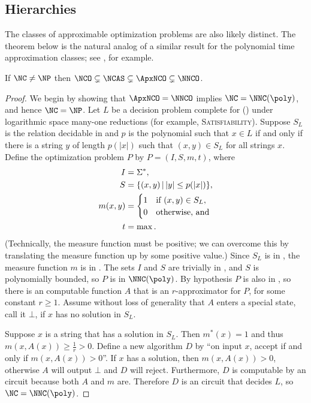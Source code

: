 \documentclass[]{article}
\let\originalleft\left
\let\originalright\right
\renewcommand{\left}{\mathopen{}\mathclose\bgroup\originalleft}
\renewcommand{\right}{\aftergroup\egroup\originalright}
\begin{document}
\subsection{Hierarchies}

The classes of approximable optimization problems are also likely distinct.
The theorem below is the natural analog of a similar result for the polynomial time approximation classes; see \cite[Exercise~8.1]{acgkmp99}, for example.

\begin{theorem}\label{thm:hierarchy}
  If $\NC \neq \NP$ then $\NCO \subsetneq \NCAS \subsetneq \ApxNCO \subsetneq \NNCO$.
\end{theorem}

\begin{proof}
  We begin by showing that $\ApxNCO = \NNCO$ implies $\NC = \NNC(\poly)$, and hence $\NC = \NP$.
  Let $L$ be a decision problem complete for \NNC(\poly) under logarithmic space many-one reductions (for example, \textsc{Satisfiability}).
  Suppose $S_L$ is the relation decidable in \NC{} and $p$ is the polynomial such that $x \in L$ if and only if there is a string $y$ of length $p(|x|)$ such that $(x, y) \in S_L$ for all strings $x$.
  Define the optimization problem $P$ by $P = (I, S, m, t)$, where
  \begin{align*}
    I & = \Sigma^*, \\
    S & = \left\{ (x, y) \,\middle|\, |y| \leq p(|x|) \right\}, \\
    m(x, y) & =
    \begin{cases}
      1 & \text{if } (x, y) \in S_L, \\
      0 & \text{otherwise, and}
    \end{cases} \\
    t & = \max.
  \end{align*}
  (Technically, the measure function must be positive; we can overcome this by translating the measure function up by some positive value.)
  Since $S_L$ is in \NC, the measure function $m$ is in \FNC.
  The sets $I$ and $S$ are trivially in \NC, and $S$ is polynomially bounded, so $P$ is in $\NNC(\poly)$.
  By hypothesis $P$ is also in \ApxNCO, so there is an \NC{} computable function $A$ that is an $r$-approximator for $P$, for some constant $r \geq 1$.
  Assume without loss of generality that $A$ enters a special state, call it $\bot$, if $x$ has no solution in $S_L$.

  Suppose $x$ is a string that has a solution in $S_L$.
  Then $m^*(x) = 1$ and thus $m(x, A(x)) \geq \frac{1}{r} > 0$.
  Define a new algorithm $D$ by ``on input $x$, accept if and only if $m(x, A(x)) > 0$''.
  If $x$ has a solution, then $m(x, A(x)) > 0$, otherwise $A$ will output $\bot$ and $D$ will reject.
  Furthermore, $D$ is computable by an \NC{} circuit because both $A$ and $m$ are.
  Therefore $D$ is an \NC circuit that decides $L$, so $\NC = \NNC(\poly)$.


\end{proof}
\end{document}
